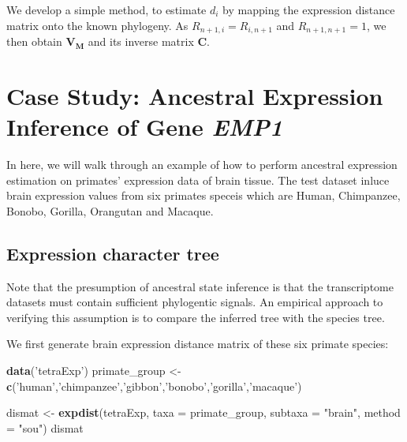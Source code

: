 \documentclass[]{book}
\newenvironment{Shaded}{\begin{snugshade}}{\end{snugshade}}
\newcommand{\DataTypeTok}[1]{\textcolor[rgb]{0.13,0.29,0.53}{#1}}
\newcommand{\KeywordTok}[1]{\textcolor[rgb]{0.13,0.29,0.53}{\textbf{#1}}}
\newcommand{\NormalTok}[1]{#1}
\newcommand{\StringTok}[1]{\textcolor[rgb]{0.31,0.60,0.02}{#1}}
\begin{document}
We develop a simple method, to estimate \(d_i\) by mapping the expression distance matrix onto the known phylogeny. As \(R_{n+1,i}= R_{i,n+1}\) and \(R_{n+1,n+1}=1\), we then obtain \(\boldsymbol{V_M}\) and its inverse matrix \(\boldsymbol{C}\).

\newpage

\hypertarget{case-study-ancestral-expression-inference-of-gene-emp1}{%
\section{\texorpdfstring{Case Study: Ancestral Expression Inference of Gene \emph{EMP1}}{Case Study: Ancestral Expression Inference of Gene EMP1}}\label{case-study-ancestral-expression-inference-of-gene-emp1}}

In here, we will walk through an example of how to perform ancestral expression estimation on primates' expression data of brain tissue. The test dataset inluce brain expression values from six primates speceis which are Human, Chimpanzee, Bonobo, Gorilla, Orangutan and Macaque.

\hypertarget{expression-character-tree-1}{%
\subsection{Expression character tree}\label{expression-character-tree-1}}

Note that the presumption of ancestral state inference is that the transcriptome datasets must contain sufficient phylogentic signals. An empirical approach to verifying this assumption is to compare the inferred tree with the species tree.

We first generate brain expression distance matrix of these six primate species:

\begin{Shaded}
\begin{Highlighting}[]
\KeywordTok{data}\NormalTok{(}\StringTok{'tetraExp'}\NormalTok{)}
\NormalTok{primate_group <-}\KeywordTok{c}\NormalTok{(}\StringTok{'human'}\NormalTok{,}\StringTok{'chimpanzee'}\NormalTok{,}\StringTok{'gibbon'}\NormalTok{,}\StringTok{'bonobo'}\NormalTok{,}\StringTok{'gorilla'}\NormalTok{,}\StringTok{'macaque'}\NormalTok{)}

\NormalTok{dismat <-}\StringTok{ }\KeywordTok{expdist}\NormalTok{(tetraExp, }\DataTypeTok{taxa =}\NormalTok{ primate_group, }
                  \DataTypeTok{subtaxa =} \StringTok{"brain"}\NormalTok{, }\DataTypeTok{method =} \StringTok{"sou"}\NormalTok{)}
\NormalTok{dismat}
\end{Highlighting}
\end{Shaded}
\end{document}

